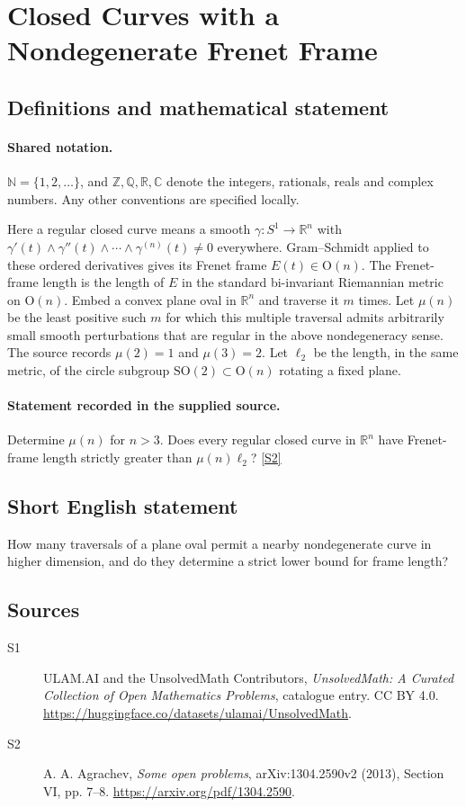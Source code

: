 \documentclass[11pt]{article}
\newcommand{\sref}[2]{\hyperlink{source:#1:#2}{[S#2]}}
\begin{document}
\section{Closed Curves with a Nondegenerate Frenet Frame}\label{statement}

\subsection{Definitions and mathematical statement}

\paragraph{Shared notation.}$\mathbb N=\{1,2,\ldots\}$, and $\mathbb Z,\mathbb Q,\mathbb R,\mathbb C$ denote the integers, rationals, reals and complex numbers. Any other conventions are specified locally.


Here a regular closed curve means a smooth $\gamma:S^1\to\mathbb R^n$ with $\gamma'(t)\wedge\gamma''(t)\wedge\cdots\wedge\gamma^{(n)}(t)\ne0$ everywhere. Gram--Schmidt applied to these ordered derivatives gives its Frenet frame $E(t)\in\mathrm O(n)$. The Frenet-frame length is the length of $E$ in the standard bi-invariant Riemannian metric on $\mathrm O(n)$. Embed a convex plane oval in $\mathbb R^n$ and traverse it $m$ times. Let $\mu(n)$ be the least positive such $m$ for which this multiple traversal admits arbitrarily small smooth perturbations that are regular in the above nondegeneracy sense. The source records $\mu(2)=1$ and $\mu(3)=2$. Let $\ell_2$ be the length, in the same metric, of the circle subgroup $\mathrm{SO}(2)\subset\mathrm O(n)$ rotating a fixed plane.
\paragraph{Statement recorded in the supplied source.}
Determine $\mu(n)$ for $n>3$. Does every regular closed curve in $\mathbb R^n$ have Frenet-frame length strictly greater than $\mu(n)\ell_2$? \sref{statement}{2}
\subsection{Short English statement}
How many traversals of a plane oval permit a nearby nondegenerate curve in higher dimension, and do they determine a strict lower bound for frame length?
\subsection{Sources}
\begin{description}
\item[\hypertarget{source:statement:1}{S1}] ULAM.AI and the UnsolvedMath Contributors, \emph{UnsolvedMath: A Curated Collection of Open Mathematics Problems}, catalogue entry. CC BY 4.0. \url{https://huggingface.co/datasets/ulamai/UnsolvedMath}.
\item[\hypertarget{source:statement:2}{S2}] A. A. Agrachev, \emph{Some open problems}, arXiv:1304.2590v2 (2013), Section VI, pp. 7--8. \url{https://arxiv.org/pdf/1304.2590}.
\end{description}
\label{end:statement}
\end{document}
